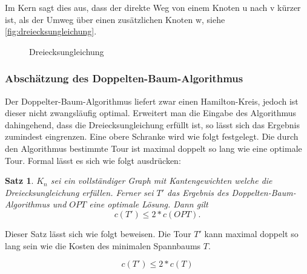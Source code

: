 \documentclass{article}
\newtheorem{mysat}{Satz}
\begin{document}
Im Kern sagt dies aus, dass der direkte Weg von einem Knoten u nach v kürzer ist, als der Umweg über einen zusätzlichen Knoten w, siehe \autoref{fig:dreiecksungleichung}.

\begin{figure}[H]
\centering
{}
\caption{Dreiecksungleichung}
\label{fig:dreiecksungleichung}
\end{figure}



\subsubsection{Abschätzung des Doppelten-Baum-Algorithmus}
Der Doppelter-Baum-Algorithmus liefert zwar einen Hamilton-Kreis, jedoch ist dieser nicht zwangsläufig optimal. Erweitert man die Eingabe des Algorithmus dahingehend, dass die Dreiecksungleichung erfüllt ist, so lässt sich das Ergebnis zumindest eingrenzen. Eine obere Schranke wird wie folgt festgelegt. Die durch den Algorithmus bestimmte Tour ist maximal doppelt so lang wie eine optimale Tour. Formal lässt es sich wie folgt ausdrücken:

\begin{mysat}\label{thm:doppelterbaum-obere-grenze}
$K_n$ sei ein vollständiger Graph mit Kantengewichten welche die Dreiecksungleichung erfüllen. Ferner sei $T'$ das Ergebnis des Doppelten-Baum-Algorithmus und $OPT$ eine optimale Lösung. Dann gilt
\begin{equation}
c(T') \leq 2 * c(OPT).
\label{eq:test}
\end{equation}
\end{mysat}

Dieser Satz lässt sich wie folgt beweisen. Die Tour $T'$ kann maximal doppelt so lang sein wie die Kosten des minimalen Spannbaums $T$.

\begin{equation}
c(T') \leq 2 * c(T)
\end{equation}
\end{document}
